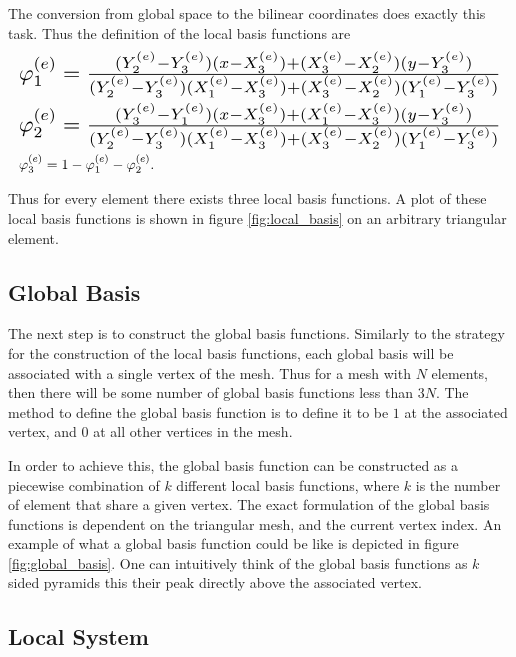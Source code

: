 \documentclass[../fem.tex]{subfile}
\begin{document}
The conversion from global space to the bilinear coordinates does exactly this
task. Thus the definition of the local basis functions are
\begin{align}
  \begin{split}
  &\resizebox{\columnwidth}{!}{$\ph^\e_1=\frac{(Y^\e_2-Y^\e_3)(x-X^\e_3)+(X^\e_3-X^\e_2)(y-Y^\e_3)}{(Y^\e_2-Y^\e_3)(X^\e_1-X^\e_3)+(X^\e_3-X^\e_2)(Y^\e_1-Y^\e_3)}$}\\
  &\resizebox{\columnwidth}{!}{$\ph^\e_2=\frac{(Y^\e_3-Y^\e_1)(x-X^\e_3)+(X^\e_1-X^\e_3)(y-Y^\e_3)}{(Y^\e_2-Y^\e_3)(X^\e_1-X^\e_3)+(X^\e_3-X^\e_2)(Y^\e_1-Y^\e_3)}$}\\
  &\ph^\e_3=1-\ph^\e_1-\ph^\e_2.
  \end{split}
\end{align}

Thus for every element there exists three local basis functions. A plot of
these local basis functions is shown in figure \ref{fig:local_basis} on an
arbitrary triangular element.

\subsection{Global Basis}%
\label{sub:global_basis}

The next step is to construct the global basis functions. Similarly to the
strategy for the construction of the local basis functions, each global basis
will be associated with a single vertex of the mesh. Thus for a mesh with $N$
elements, then there will be some number of global basis functions less than
$3N$. The method to define the global basis function is to define it to be $1$
at the associated vertex, and $0$ at all other vertices in the mesh.

In order to achieve this, the global basis function can be constructed as a
piecewise combination of $k$ different local basis functions, where $k$ is the
number of element that share a given vertex. The exact formulation of the
global basis functions is dependent on the triangular mesh, and the current
vertex index. An example of what a global basis function could be like is
depicted in figure \ref{fig:global_basis}. One can intuitively think of the
global basis functions as $k$ sided pyramids this their peak directly above the
associated vertex.

\subsection{Local System}%
\label{sub:local_system}
\end{document}
